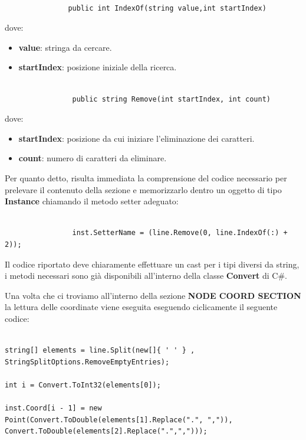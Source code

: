 \documentclass[11pt]{article}
\begin{document}
\begin{lstlisting}

               public int IndexOf(string value,int startIndex)

\end{lstlisting}

dove:

\begin{itemize}
	\item \textbf{value}: stringa da cercare.
	\item \textbf{startIndex}: posizione iniziale della ricerca.
\end{itemize}

\begin{lstlisting}

                public string Remove(int startIndex, int count)

\end{lstlisting}


dove:

\begin{itemize}
	\item \textbf{startIndex}: posizione da cui iniziare l'eliminazione dei caratteri.
	\item \textbf{count}: numero di caratteri da eliminare.
\end{itemize}

Per quanto detto, risulta immediata la comprensione del codice necessario per prelevare il contenuto della sezione e memorizzarlo dentro un oggetto di tipo \textbf{Instance} chiamando il metodo setter adeguato:

\begin{lstlisting}

                inst.SetterName = (line.Remove(0, line.IndexOf(:) + 2));

\end{lstlisting}

Il codice riportato deve chiaramente effettuare un cast per i tipi diversi da string, i metodi necessari sono già disponibili all'interno della classe \textbf{Convert} di C\#.

Una volta che ci troviamo all'interno della sezione \textbf{NODE COORD SECTION} la lettura delle coordinate viene eseguita eseguendo ciclicamente il seguente codice:

\begin{lstlisting}

string[] elements = line.Split(new[]{ ' ' } , StringSplitOptions.RemoveEmptyEntries);

int i = Convert.ToInt32(elements[0]);

inst.Coord[i - 1] = new Point(Convert.ToDouble(elements[1].Replace(".", ",")), Convert.ToDouble(elements[2].Replace(".",",")));
\end{lstlisting}
\end{document}
